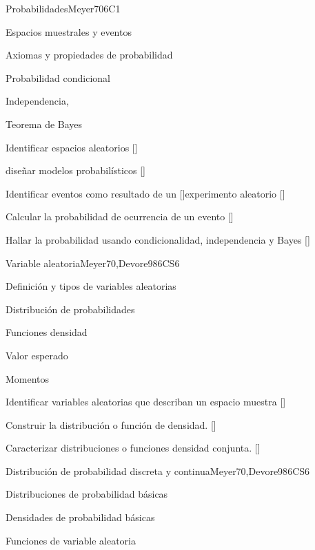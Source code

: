 \begin{syllabus}
\begin{unit}{}{Probabilidades}{Meyer70}{6}{C1}
\begin{topics}
      \item Espacios muestrales y eventos
      \item Axiomas y propiedades de probabilidad
      \item Probabilidad condicional
      \item Independencia,
      \item Teorema de Bayes
   \end{topics}
   \begin{learningoutcomes}
      \item Identificar espacios aleatorios [\Usage]
      \item diseñar  modelos probabilísticos [\Usage]
      \item Identificar eventos como resultado de un  [\Usage]experimento aleatorio [\Usage]
      \item Calcular la probabilidad de ocurrencia de un evento [\Usage]
      \item Hallar la probabilidad usando condicionalidad, independencia y Bayes [\Usage]
   \end{learningoutcomes}
\end{unit}

\begin{unit}{}{Variable aleatoria}{Meyer70,Devore98}{6}{CS6}
\begin{topics}
      \item Definición y tipos de variables aleatorias 
      \item Distribución de probabilidades
      \item Funciones densidad
      \item Valor esperado
      \item Momentos
   \end{topics}

   \begin{learningoutcomes}
      \item Identificar variables aleatorias que describan un espacio muestra [\Usage]
      \item Construir la distribución o función de densidad. [\Usage]
      \item Caracterizar distribuciones o funciones densidad conjunta. [\Usage]
   \end{learningoutcomes}
\end{unit}

\begin{unit}{}{Distribución de probabilidad discreta y continua}{Meyer70,Devore98}{6}{CS6}
\begin{topics}
      \item Distribuciones de probabilidad básicas
      \item Densidades de probabilidad básicas
      \item Funciones de variable aleatoria
   \end{topics}


\end{unit}
\end{syllabus}
